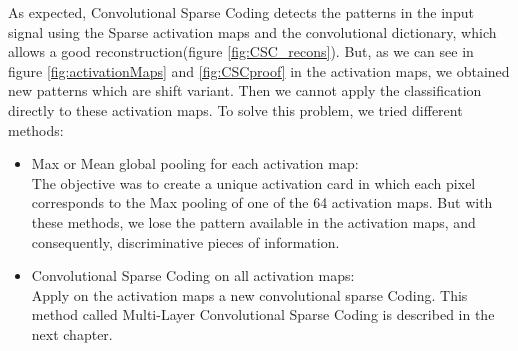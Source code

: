 As expected, Convolutional Sparse Coding detects the patterns in the input signal using the Sparse activation maps and the convolutional dictionary, which allows a good reconstruction(figure \ref{fig:CSC_recons}). But, as we can see in figure \ref{fig:activationMaps} and \ref{fig:CSCproof} in the activation maps, we obtained new patterns which are shift variant. Then we cannot apply the classification directly to these activation maps. To solve this problem, we tried different methods:
\begin{itemize}
 \item Max or Mean global pooling for each activation map:\\
 The objective was to create a unique activation card in which each pixel corresponds to the Max pooling of one of the 64 activation maps. But with these methods, we lose the pattern available in the activation maps, and consequently, discriminative pieces of information.
 \item Convolutional Sparse Coding on all activation maps:\\
 Apply on the activation maps a new convolutional sparse Coding. This method called Multi-Layer Convolutional Sparse Coding is described in the next chapter.
\end{itemize}
% 
